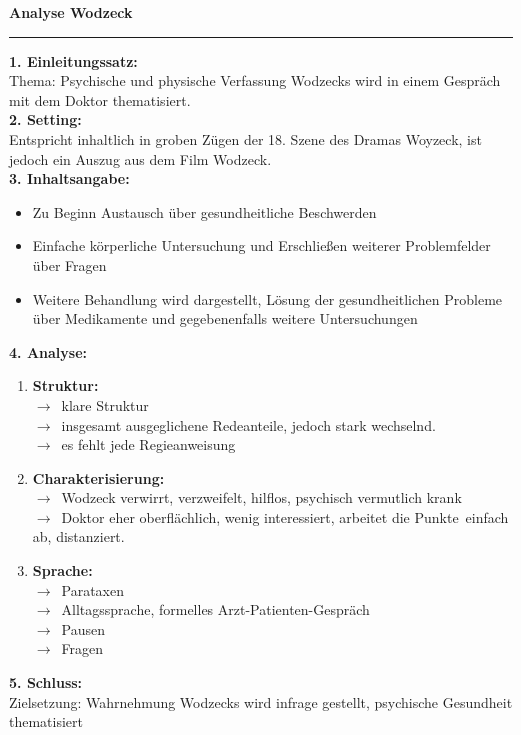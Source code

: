 \documentclass[12pt,a4paper]{report}
\newcommand{\psx}[0]{$\to$\ }
\begin{document}
	\noindent
	\Large
	\textbf{Analyse Wodzeck}
	\hrule
	\vspace{0.2cm}
	\large
	\noindent
	\textbf{1. Einleitungssatz:} \\
	Thema: Psychische und physische Verfassung Wodzecks wird in einem Gespräch mit dem Doktor thematisiert.
	\\
	\textbf{2. Setting:} \\
	Entspricht inhaltlich in groben Zügen der 18. Szene des Dramas Woyzeck, ist jedoch ein Auszug aus dem Film Wodzeck.
	\\
	\textbf{3. Inhaltsangabe:}
	\begin{itemize}
		\item Zu Beginn Austausch über gesundheitliche Beschwerden
		\item Einfache körperliche Untersuchung und Erschließen weiterer Problemfelder über Fragen
		\item Weitere Behandlung wird dargestellt, Lösung der gesundheitlichen Probleme über Medikamente und gegebenenfalls weitere Untersuchungen
	\end{itemize}
	\textbf{4. Analyse:}
	\begin{enumerate}
		\item \textbf{Struktur:} \\
		\psx klare Struktur \\
		\psx insgesamt ausgeglichene Redeanteile, jedoch stark wechselnd. \\
		\psx es fehlt jede Regieanweisung
		\item \textbf{Charakterisierung:} \\
		\psx Wodzeck verwirrt, verzweifelt, hilflos, psychisch vermutlich krank \\
		\psx Doktor eher oberflächlich, wenig interessiert, arbeitet die \dq Punkte\dq\ einfach ab, distanziert.
		\item \textbf{Sprache:} \\
		\psx Parataxen \\
		\psx Alltagssprache, formelles Arzt-Patienten-Gespräch \\
		\psx Pausen \\
		\psx Fragen
	\end{enumerate}
	\textbf{5. Schluss:} \\
	Zielsetzung: \dq Wahrnehmung Wodzecks wird infrage gestellt, psychische Gesundheit thematisiert\dq
\end{document}
